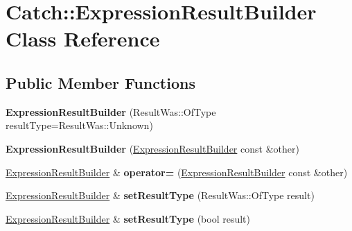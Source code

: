 \hypertarget{class_catch_1_1_expression_result_builder}{\section{Catch\-:\-:Expression\-Result\-Builder Class Reference}
\label{class_catch_1_1_expression_result_builder}
}
\subsection*{Public Member Functions}
\begin{DoxyCompactItemize}
\item 
\hypertarget{class_catch_1_1_expression_result_builder_a315f8bfd20dff134f82eae5ca2270c79}{{\bfseries Expression\-Result\-Builder} (Result\-Was\-::\-Of\-Type result\-Type=Result\-Was\-::\-Unknown)}\label{class_catch_1_1_expression_result_builder_a315f8bfd20dff134f82eae5ca2270c79}

\item 
\hypertarget{class_catch_1_1_expression_result_builder_a6ec5755b27a2b6c6b1e37dae83c5d5ba}{{\bfseries Expression\-Result\-Builder} (\hyperlink{class_catch_1_1_expression_result_builder}{Expression\-Result\-Builder} const \&other)}\label{class_catch_1_1_expression_result_builder_a6ec5755b27a2b6c6b1e37dae83c5d5ba}

\item 
\hypertarget{class_catch_1_1_expression_result_builder_a3f4926aa71d8e4a6f1069b664cd677d2}{\hyperlink{class_catch_1_1_expression_result_builder}{Expression\-Result\-Builder} \& {\bfseries operator=} (\hyperlink{class_catch_1_1_expression_result_builder}{Expression\-Result\-Builder} const \&other)}\label{class_catch_1_1_expression_result_builder_a3f4926aa71d8e4a6f1069b664cd677d2}

\item 
\hypertarget{class_catch_1_1_expression_result_builder_ac6e748b2aaf7a13945dffc363123975b}{\hyperlink{class_catch_1_1_expression_result_builder}{Expression\-Result\-Builder} \& {\bfseries set\-Result\-Type} (Result\-Was\-::\-Of\-Type result)}\label{class_catch_1_1_expression_result_builder_ac6e748b2aaf7a13945dffc363123975b}

\item 
\hypertarget{class_catch_1_1_expression_result_builder_af3e2ba84cc7a0cfb892b00fc5ea7553f}{\hyperlink{class_catch_1_1_expression_result_builder}{Expression\-Result\-Builder} \& {\bfseries set\-Result\-Type} (bool result)}\label{class_catch_1_1_expression_result_builder_af3e2ba84cc7a0cfb892b00fc5ea7553f}


\end{DoxyCompactItemize}
